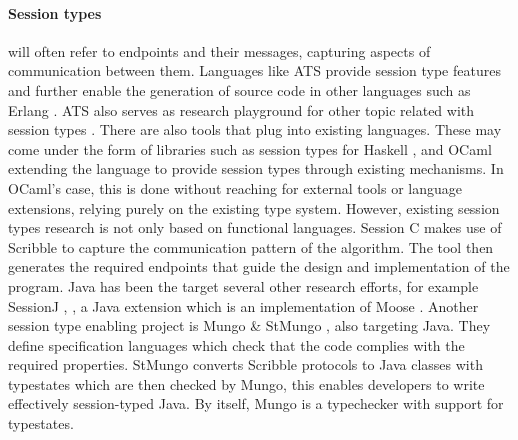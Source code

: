 \paragraph{Session types} will often refer to endpoints and their messages, capturing aspects of communication between them.
Languages like ATS provide session type features and further enable the generation of source code in other languages
such as Erlang \autocite{Xi2016}. ATS also serves as research playground for other topic related with session types \autocite{Xi2016a}.
There are also tools that plug into existing languages.
These may come under the form of libraries such as session types
for Haskell \autocite[Section 3.3]{Ancona2016}, \autocite[Chapter 10]{Gay2017} and OCaml \autocite[Chapter 11]{Gay2017}
extending the language to provide session types through existing mechanisms.
In OCaml's case, this is done without reaching for external tools or language extensions,
relying purely on the existing type system.
However, existing session types research is not only based on functional languages.
Session C \autocite[Section 4.1]{Ancona2016} makes use of Scribble \autocite{Yoshida2014} to capture the communication pattern of the algorithm.
The tool then generates the required endpoints that guide the design and implementation of the program.
Java has been the target several other research efforts, for example SessionJ \autocite[Section 2.2.1]{Ancona2016}, \autocite{Hu2008},
a Java extension which is an implementation of Moose \autocite[Section 2.1.1]{Ancona2016}.
Another session type enabling project is Mungo \& StMungo \autocite{Kouzapas2018, Voinea2020}, also targeting Java.
They define specification languages which check that the code complies with the required properties.
StMungo converts Scribble protocols to Java classes with typestates which are then checked by Mungo,
this enables developers to write effectively session-typed Java.
By itself, Mungo is a typechecker with support for typestates.


